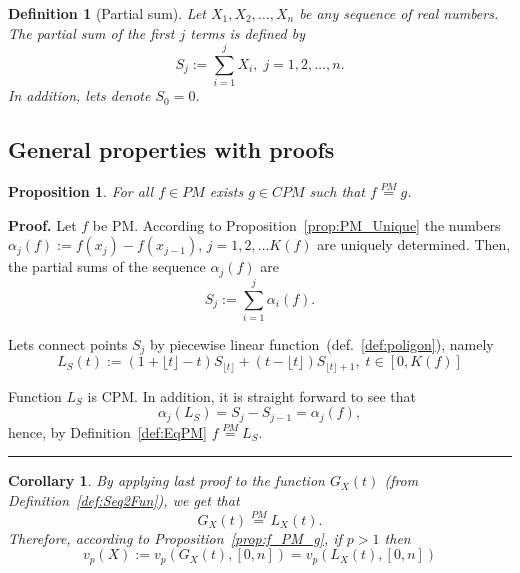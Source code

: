 \documentclass[12pt, a4paper]{article}
\newtheorem{proposition}[theorem]{Proposition}
\newtheorem{definition}[theorem]{Definition}
\newtheorem{corollary}[theorem]{Corollary}
\newenvironment{proof}[1][Proof]{\noindent \textbf{#1.} }{\  \rule{0.5em}{0.5em}}
\numberwithin{equation}{section}
\begin{document}
\begin{definition}[Partial sum]
  Let $X_1, X_2,\dots,X_n$ be any sequence of real numbers. 
  The \emph{partial sum} of the first $j$ terms is defined by  
  \begin{equation}
    S_j:=\sum_{i=1}^j X_i, \; j=1,2,\dots,n.
  \end{equation}
  In addition, lets denote $S_0=0$.  
\end{definition}

\subsection{General properties with proofs}


\begin{proposition}\label{prop:PM2CPM}
  For all $f \in PM$ exists $g \in CPM$ such that $f \stackrel{PM}{=} g$.
\end{proposition} 
\begin{proof}
  Let $f$ be PM. According to Proposition~\ref{prop:PM_Unique} the
  numbers $\alpha_j(f):=f(x_j) - f(x_{j-1})$, $j=1,2,\dots K(f)$
  are uniquely determined.
  Then, the partial sums of the sequence $\alpha_j(f)$ are
  \begin{equation}
    S_j:=\sum_{i=1}^j \alpha_i(f).
  \end{equation}    

  Lets connect points $S_j$ by 
  piecewise linear function~(def.~\ref{def:poligon}), namely
  \begin{equation}
  L_S(t) := (1+\lfloor t \rfloor-t)S_{\lfloor t \rfloor} + (t-\lfloor t \rfloor)S_{\lfloor t \rfloor+1}   ,\;t\in[0,K(f)]
  \end{equation}  
   
  Function $L_S$ is CPM. In addition, 
  it is straight forward to see that 
  \begin{equation}
  \alpha_j(L_S)=S_j-S_{j-1}=\alpha_j(f),
  \end{equation}
  hence, by Definition~\ref{def:EqPM} $f \stackrel{PM}{=} L_S$.  
\end{proof}

\begin{corollary}\label{cor:PM2CPM}
  By applying last proof to the function 
  $G_X(t)$ (from Definition~\ref{def:Seq2Fun}), we get that 
  \begin{equation}
    G_X(t)\stackrel{PM}{=}L_X(t).
  \end{equation}
  Therefore, according to Proposition~\ref{prop:f_PM_g}, if $p>1$ then
  \begin{equation}
    v_p(X) := v_p(G_X(t),[0,n])= v_p(L_X(t),[0,n])
  \end{equation}
\end{corollary}
\end{document}
